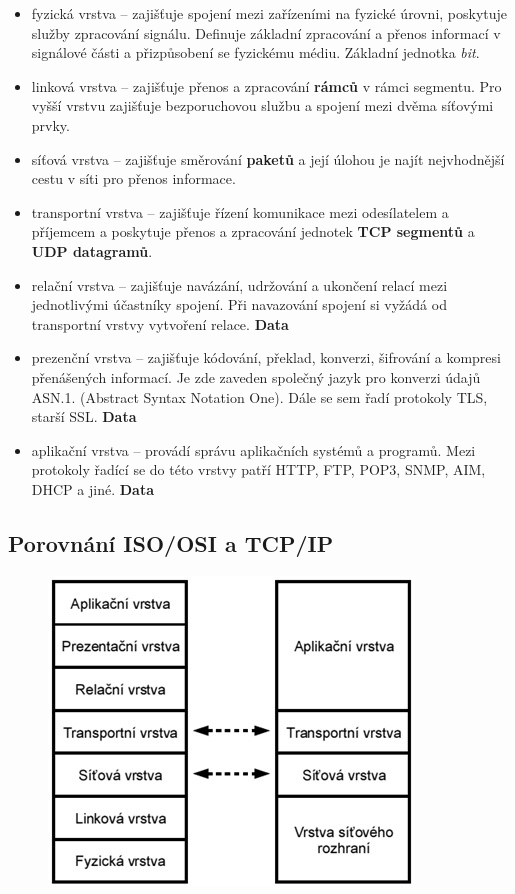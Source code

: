 \begin{itemize}
    \item fyzická vrstva – zajišťuje spojení mezi zařízeními na fyzické úrovni, poskytuje služby zpracování signálu. Definuje základní zpracování a přenos informací v signálové části a přizpůsobení se fyzickému médiu. Základní jednotka \textit{bit}.
    \item linková vrstva – zajišťuje přenos a zpracování \textbf{rámců} v rámci segmentu. Pro vyšší vrstvu zajišťuje bezporuchovou službu a spojení mezi dvěma síťovými prvky.
    \item síťová vrstva – zajišťuje směrování \textbf{paketů} a její úlohou je najít nejvhodnější cestu v síti pro přenos informace.
    \item transportní vrstva – zajišťuje řízení komunikace mezi odesílatelem a příjemcem a poskytuje přenos a zpracování jednotek \textbf{TCP segmentů} a \textbf{UDP datagramů}.
    \item relační vrstva – zajišťuje navázání, udržování a ukončení relací mezi jednotlivými účastníky spojení. Při navazování spojení si vyžádá od transportní vrstvy vytvoření relace. \textbf{Data}
    \item prezenční vrstva – zajišťuje kódování, překlad, konverzi, šifrování a kompresi přenášených informací. Je zde zaveden společný jazyk pro konverzi údajů ASN.1. (Abstract Syntax Notation One). Dále se sem řadí protokoly TLS, starší SSL. \textbf{Data}
    \item aplikační vrstva – provádí správu aplikačních systémů a programů. Mezi protokoly řadící se do této vrstvy patří HTTP, FTP, POP3, SNMP, AIM, DHCP a jiné. \textbf{Data}
\end{itemize}

\subsection{Porovnání ISO/OSI a TCP/IP}
\begin{figure} [h]
    \centering
    \includegraphics[scale=0.85]{snimky/Vrstvy2.jpg}
\end{figure}

